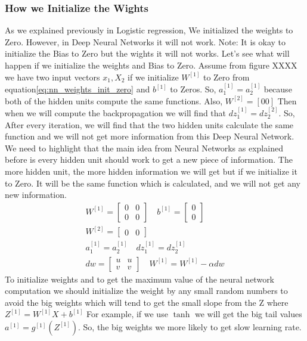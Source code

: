 \subsubsection{How we Initialize the Wights}

    As we explained previously in Logistic regression, We initialized the weights to Zero. However, in Deep Neural Networks it will not work. Note: It is okay to initialize the Bias to Zero but the wights it will not works. Let's see what will happen if we initialize the weights and Bias to Zero.
  Assume from figure XXXX we have two input vectors $x_1,X_2$ if we initialize $W^{[1]}$ to Zero from equation\eqref{eq:nn_weights_init_zero} and $b^{[1]}$ to Zeros. So, $a_1^{[1]}=a_2^{[1]}$ because both of the hidden units compute the same functions. Also, $W^{[2]}=[0 0]$ Then when we will compute the backpropagation we will find that $dz_1^{[1]}=dz_2^{[2]}$. So, After every iteration, we will find that the two hidden units calculate the same function and we will not get more information from this Deep Neural Network. We need to highlight that the main idea from Neural Networks as explained before is every hidden unit should work to get a new piece of information. The more hidden unit, the more hidden information we will get but if we initialize it to Zero. It will be the same function which is calculated, and we will not get any new information.%
\begin{subequations}\label{eq:nn_weights_init_zero}
\begin{align}
  W^{[1]} = \begin{bmatrix} 0 & 0\\ 0 & 0 \end{bmatrix} \quad b^{[1]} = \begin{bmatrix} 0 \\ 0 \end{bmatrix} \\
  W^{[2]} = \begin{bmatrix} 0 & 0 \end{bmatrix} \\
  a_1^{[1]} = a_2^{[1]} \quad     dz_1^{[1]} = dz_2^{[1]}\\
  dw = \begin{bmatrix} u & u \\ v & v \end{bmatrix} \quad W^{[1]} = W^{[1]} - \alpha dw
\end{align}
\end{subequations}%
To initialize weights and to get the maximum value of the neural network computation we should initialize the weight by any small random numbers to avoid the big weights which will tend to get the small slope from the Z where $Z^{[1]}= W^{[1]} X + b^{[1]}$ For example, if we use $\tanh$ we will get the big tail values $a^{[1]}= g^{[1]}(Z^{[1]})$. So, the big weights we more likely to get slow learning rate. 

